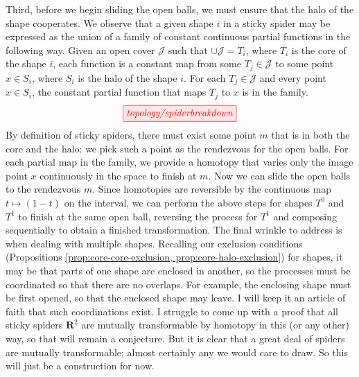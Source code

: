 \begin{myboxB}
Third, before we begin sliding the open balls, we must ensure that the halo of the shape cooperates. We observe that a given shape $i$ in a sticky spider may be expressed as the union of a family of constant continuous partial functions in the following way. Given an open cover $\mathcal{J}$ such that $\cup\mathcal{J} = T_i$, where $T_i$ is the core of the shape $i$, each function is a constant map from some $T_j \in \mathcal{J}$ to some point $x \in S_i$, where $S_i$ is the halo of the shape $i$. For each $T_j \in \mathcal{J}$ and every point $x \in S_i$, the constant partial function that maps $T_j$ to $x$ is in the family.
\[\tikzfig{topology/spiderbreakdown}\]
By definition of sticky spiders, there must exist some point $m$ that is in both the core and the halo: we pick such a point as the rendezvous for the open balls. For each partial map in the family, we provide a homotopy that varies only the image point $x$ continuously in the space to finish at $m$. Now we can slide the open balls to the rendezvous $m$. Since homotopies are reversible by the continuous map $t \mapsto (1-t)$ on the interval, we can perform the above steps for shapes $T^0$ and $T^1$ to finish at the same open ball, reversing the process for $T^1$ and composing sequentially to obtain a finished transformation. The final wrinkle to address is when dealing with multiple shapes. Recalling our exclusion conditions (Propositions \ref{prop:core-core-exclusion, prop:core-halo-exclusion}) for shapes, it may be that parts of one shape are enclosed in another, so the processes must be coordinated so that there are no overlaps. For example, the enclosing shape must be first opened, so that the enclosed shape may leave. I will keep it an article of faith that such coordinations exist. I struggle to come up with a proof that all sticky spiders $\mathbf{R}^2$ are mutually transformable by homotopy in this (or any other) way, so that will remain a conjecture. But it is clear that a great deal of spiders are mutually transformable; almost certainly any we would care to draw. So this will just be a construction for now.
\end{myboxB}

\clearpage
\newpage

